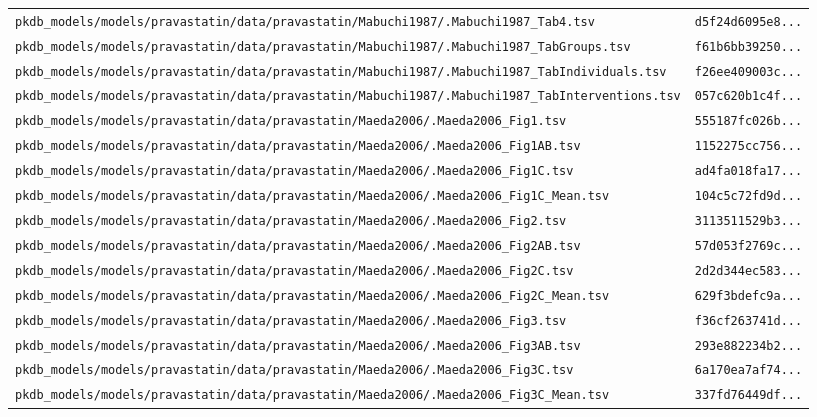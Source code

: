 \begin{longtable}{ll}
\texttt{pkdb\_models/models/pravastatin/data/pravastatin/Mabuchi1987/.Mabuchi1987\_Tab4.tsv} & \texttt{d5f24d6095e8...} \\
\texttt{pkdb\_models/models/pravastatin/data/pravastatin/Mabuchi1987/.Mabuchi1987\_TabGroups.tsv} & \texttt{f61b6bb39250...} \\
\texttt{pkdb\_models/models/pravastatin/data/pravastatin/Mabuchi1987/.Mabuchi1987\_TabIndividuals.tsv} & \texttt{f26ee409003c...} \\
\texttt{pkdb\_models/models/pravastatin/data/pravastatin/Mabuchi1987/.Mabuchi1987\_TabInterventions.tsv} & \texttt{057c620b1c4f...} \\
\texttt{pkdb\_models/models/pravastatin/data/pravastatin/Maeda2006/.Maeda2006\_Fig1.tsv} & \texttt{555187fc026b...} \\
\texttt{pkdb\_models/models/pravastatin/data/pravastatin/Maeda2006/.Maeda2006\_Fig1AB.tsv} & \texttt{1152275cc756...} \\
\texttt{pkdb\_models/models/pravastatin/data/pravastatin/Maeda2006/.Maeda2006\_Fig1C.tsv} & \texttt{ad4fa018fa17...} \\
\texttt{pkdb\_models/models/pravastatin/data/pravastatin/Maeda2006/.Maeda2006\_Fig1C\_Mean.tsv} & \texttt{104c5c72fd9d...} \\
\texttt{pkdb\_models/models/pravastatin/data/pravastatin/Maeda2006/.Maeda2006\_Fig2.tsv} & \texttt{3113511529b3...} \\
\texttt{pkdb\_models/models/pravastatin/data/pravastatin/Maeda2006/.Maeda2006\_Fig2AB.tsv} & \texttt{57d053f2769c...} \\
\texttt{pkdb\_models/models/pravastatin/data/pravastatin/Maeda2006/.Maeda2006\_Fig2C.tsv} & \texttt{2d2d344ec583...} \\
\texttt{pkdb\_models/models/pravastatin/data/pravastatin/Maeda2006/.Maeda2006\_Fig2C\_Mean.tsv} & \texttt{629f3bdefc9a...} \\
\texttt{pkdb\_models/models/pravastatin/data/pravastatin/Maeda2006/.Maeda2006\_Fig3.tsv} & \texttt{f36cf263741d...} \\
\texttt{pkdb\_models/models/pravastatin/data/pravastatin/Maeda2006/.Maeda2006\_Fig3AB.tsv} & \texttt{293e882234b2...} \\
\texttt{pkdb\_models/models/pravastatin/data/pravastatin/Maeda2006/.Maeda2006\_Fig3C.tsv} & \texttt{6a170ea7af74...} \\
\texttt{pkdb\_models/models/pravastatin/data/pravastatin/Maeda2006/.Maeda2006\_Fig3C\_Mean.tsv} & \texttt{337fd76449df...} \\

\end{longtable}
